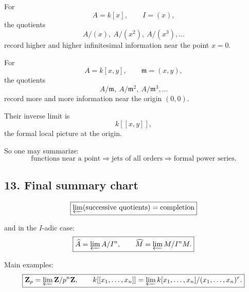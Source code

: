 \documentclass[12pt,a4paper]{article}
\theoremstyle{plain}
\theoremstyle{definition}      %
\begin{document}
For
\[
A=k[x],\qquad I=(x),
\]
the quotients
\[
A/(x),\ A/(x^2),\ A/(x^3),\dots
\]
record higher and higher infinitesimal information near the point \(x=0\).

For
\[
A=k[x,y],\qquad \mathfrak m=(x,y),
\]
the quotients
\[
A/\mathfrak m,\ A/\mathfrak m^2,\ A/\mathfrak m^3,\dots
\]
record more and more information near the origin \((0,0)\).

Their inverse limit is
\[
k[[x,y]],
\]
the formal local picture at the origin.

So one may summarize:
\[
\text{functions near a point}
\Longrightarrow
\text{jets of all orders}
\Longrightarrow
\text{formal power series}.
\]

\subsection*{13. Final summary chart}

\[
\boxed{
	\varprojlim(\text{successive quotients})=\text{completion}
}
\]

and in the \(I\)-adic case:
\[
\boxed{
	\widehat A=\varprojlim A/I^n,\qquad
	\widehat M=\varprojlim M/I^nM.
}
\]

Main examples:
\[
\boxed{
	\mathbf Z_p=\varprojlim \mathbf Z/p^n\mathbf Z,
	\qquad
	k[[x_1,\dots,x_n]]
	=
	\varprojlim k[x_1,\dots,x_n]/(x_1,\dots,x_n)^r.
}
\]
	
\end{document}
